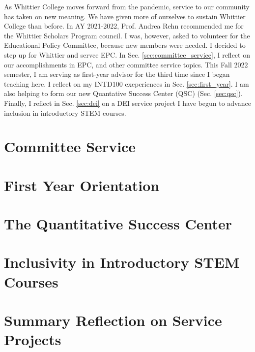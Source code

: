\documentclass[../../main.tex]{subfiles}
\begin{document}
\label{sec:service}

As Whittier College moves forward from the pandemic, service to our community has taken on new meaning.  We have given more of ourselves to sustain Whittier College than before.  In AY 2021-2022, Prof. Andrea Rehn recommended me for the Whittier Scholars Program council.  I was, however, asked to volunteer for the Educational Policy Committee, because new members were needed.  I decided to step up for Whittier and servce EPC.  In Sec. \ref{sec:committee_service}, I reflect on our accomplishments in EPC, and other committee service topics.  This Fall 2022 semester, I am serving as first-year advisor for the third time since I began teaching here.  I reflect on my INTD100 exeperiences in Sec. \ref{sec:first_year}.  I am also helping to form our new Quantative Success Center (QSC) (Sec. \ref{sec:qsc}).  Finally, I reflect in Sec. \ref{sec:dei} on a DEI service project I have begun to advance inclusion in introductory STEM courses.

\section{Committee Service}

\begin{flushleft}

\end{flushleft}

\section{First Year Orientation}

\begin{flushleft}

\end{flushleft}

\section{The Quantitative Success Center}

\begin{flushleft}

\end{flushleft}

\section{Inclusivity in Introductory STEM Courses}

\begin{flushleft}

\end{flushleft}

\section{Summary Reflection on Service Projects}

\begin{flushleft}

\end{flushleft}
\end{document}
